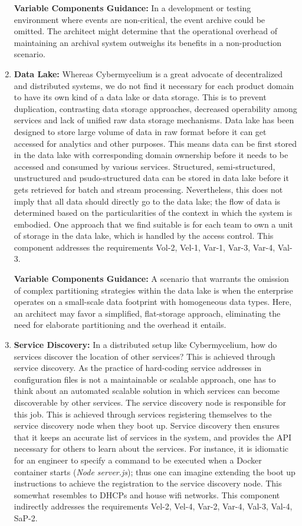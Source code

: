 \documentclass[review]{elsarticle}
\begin{document}
\begin{enumerate}
    \textbf{Variable Components Guidance:} In a development or testing environment where events are non-critical, the event archive could be omitted. The architect might determine that the operational overhead of maintaining an archival system outweighs its benefits in a non-production scenario.

    \item \textbf{Data Lake:} Whereas Cybermycelium is a great advocate of decentralized and distributed systems, we do not find it necessary for each product domain to have its own kind of a data lake or data storage. This is to prevent duplication, contrasting data storage approaches, decreased operability among services and lack of unified raw data storage mechanisms. Data lake has been designed to store large volume of data in raw format before it can get accessed for analytics and other purposes. This means data can be first stored in the data lake with corresponding domain ownership before it needs to be accessed and consumed by various services. Structured, semi-structured, unstructured and psudo-structured data can be stored in data lake before it gets retrieved for batch and stream processing. Nevertheless, this does not imply that all data should directly go to the data lake; the flow of data is determined based on the particularities of the context in which the system is embodied. One approach that we find suitable is for each team to own a unit of storage in the data lake, which is handled by the access control. This component addresses the requirements Vol-2, Vel-1, Var-1, Var-3, Var-4, Val-3.
    
    \textbf{Variable Components Guidance:} A scenario that warrants the omission of complex partitioning strategies within the data lake is when the enterprise operates on a small-scale data footprint with homogeneous data types. Here, an architect may favor a simplified, flat-storage approach, eliminating the need for elaborate partitioning and the overhead it entails.
    

    \item \textbf{Service Discovery:} In a distributed setup like Cybermycelium, how do services discover the location of other services? This is achieved through service discovery. As the practice of hard-coding service addresses in configuration files is not a maintainable or scalable approach, one has to think about an automated scalable solution in which services can become discoverable by other services. The service discovery node is responsible for this job. This is achieved through services registering themselves to the service discovery node when they boot up. Service discovery then ensures that it keeps an accurate list of services in the system, and provides the API necessary for others to learn about the services. For instance, it is idiomatic for an engineer to specify a command to be executed when a Docker container starts (\emph{Node server.js}); thus one can imagine extending the boot up instructions to achieve the registration to the service discovery node. This somewhat resembles to DHCPs and house wifi networks.  This component indirectly addresses the requirements Vel-2, Vel-4, Var-2, Var-4, Val-3, Val-4, SaP-2.
    

\end{enumerate}
\end{document}
